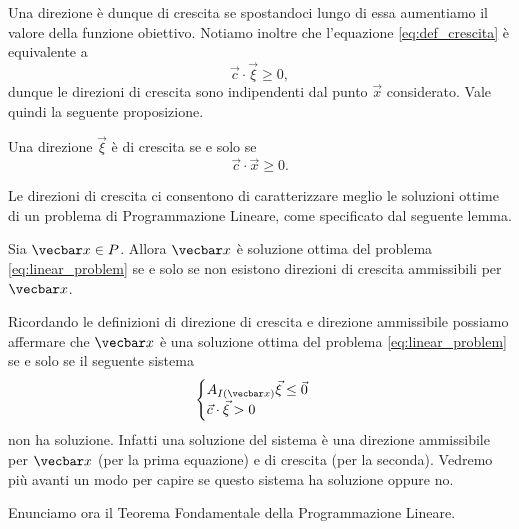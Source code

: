 Una direzione è dunque di crescita se spostandoci lungo di essa aumentiamo il valore della funzione obiettivo. Notiamo inoltre che l'equazione \eqref{eq:def_crescita} è equivalente a \[
    \vec c \cdot \vec \xi \geq 0, 
\] dunque le direzioni di crescita sono indipendenti dal punto $\vec x$ considerato. Vale quindi la seguente proposizione.

\begin{proposition}
    Una direzione $\vec \xi$ è di crescita se e solo se \begin{equation}
        \vec c \cdot \vec x \geq 0.
    \end{equation}
\end{proposition}

Le direzioni di crescita ci consentono di caratterizzare meglio le soluzioni ottime di un problema di Programmazione Lineare, come specificato dal seguente lemma.

\begin{lemma}
    Sia $\vecbar x \in P$. Allora $\vecbar x$ è soluzione ottima del problema \eqref{eq:linear_problem} se e solo se non esistono direzioni di crescita ammissibili per $\vecbar x$.
\end{lemma}

Ricordando le definizioni di direzione di crescita e direzione ammissibile possiamo affermare che $\vecbar x$ è una soluzione ottima del problema \eqref{eq:linear_problem} se e solo se il seguente sistema \begin{equation*}
    \begin{cases}
        A_{I(\vecbar x)}\vec \xi \leq \vec 0\\
        \vec c \cdot \vec \xi > 0
    \end{cases}
\end{equation*}
non ha soluzione. Infatti una soluzione del sistema è una direzione ammissibile per $\vecbar x$ (per la prima equazione) e di crescita (per la seconda). Vedremo più avanti un modo per capire se questo sistema ha soluzione oppure no.

Enunciamo ora il Teorema Fondamentale della Programmazione Lineare.

